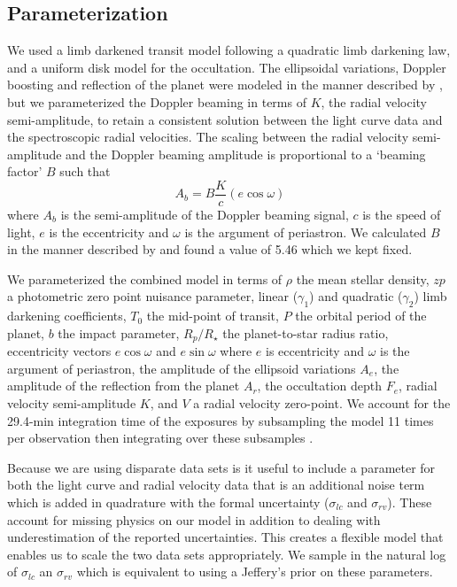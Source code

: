 \documentclass[apjl]{emulateapj}
\begin{document}
\subsection{Parameterization}
We used a limb darkened transit model \citep{mandel02} following a quadratic limb darkening law, and a uniform disk model for the occultation.  The ellipsoidal variations, Doppler boosting and reflection of the planet were modeled in the manner described by \citet{lillo14}, but we parameterized the Doppler beaming in terms of $K$, the radial velocity semi-amplitude, to retain a consistent solution between the light curve data and the spectroscopic radial velocities. The scaling between the radial velocity semi-amplitude and the Doppler beaming amplitude is proportional to a `beaming factor' $B$ such that
\begin{equation}
A_b = B \frac{K}{c} (e\cos{\omega})
\end{equation}
where $A_b$ is the semi-amplitude of the Doppler beaming signal, $c$ is the speed of light, $e$ is the eccentricity and $\omega$ is the argument of periastron. We calculated $B$ in the manner described by \citet{bloemen11} and found a value of 5.46 which we kept fixed. 

We parameterized the combined model in terms of $\rho$ the mean stellar density, $zp$ a photometric zero point nuisance parameter, linear ($\gamma_1$) and quadratic ($\gamma_2$) limb darkening coefficients, $T_0$ the mid-point of transit, $P$ the orbital period of the planet, $b$ the impact parameter, $R_{p}/R_{\star}$ the planet-to-star radius ratio, eccentricity vectors $e\cos{\omega}$ and $e\sin{\omega}$ where $e$ is eccentricity and $\omega$ is the argument of periastron, the amplitude of the ellipsoid variations $A_e$, the amplitude of the reflection from the planet $A_r$, the occultation depth $F_e$, radial velocity semi-amplitude $K$, and $V$ a radial velocity zero-point. We account for the 29.4-min integration time of the exposures by subsampling the model 11 times per observation then integrating over these subsamples \citep{kipping10}.

Because we are using disparate data sets is it useful to include a parameter for both the light curve and radial velocity data that is an additional noise term which is added in quadrature with the formal uncertainty ($\sigma_{lc}$ and $\sigma_{rv}$). These account for missing physics on our model in addition to dealing with underestimation of the reported uncertainties. This creates a flexible model that enables us to scale the two data sets appropriately. We sample in the natural log of $\sigma_{lc}$ an $\sigma_{rv}$ which is equivalent to using a Jeffery's prior on these parameters.
\end{document}
